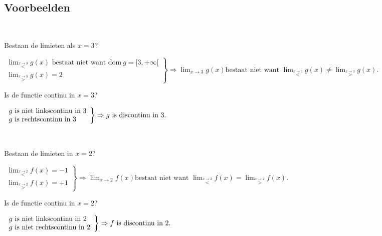 \subsection{Voorbeelden}
\begin{voorbeeld}
	\ \\


\begin{figure}[H]
	\centering
	
\end{figure}

	
Bestaan de limieten als $x=3$?

\begin{math}
\left. \begin{array}{l}
\lim_{\overset{x\rightarrow3}{<}}g(x) \text{ bestaat niet want dom} \ g=[3,+\infty[\\
 \lim_{\overset{x\rightarrow3}{>}}g(x)=2
\end{array}
\right\}
\Rightarrow \lim_{x\to3}g(x) \text{bestaat niet want } \lim_{\overset{x\rightarrow3}{<}}g(x) \neq \lim_{\overset{x\rightarrow3}{>}}g(x).
\end{math}

Is de functie continu in $x=3$?

\begin{math}
\centering
\left. \begin{array}{l}
g \text{ is niet linkscontinu in }3\\
g \text{ is rechtscontinu in }3
\end{array}
\right\}
\Rightarrow g \text{ is discontinu in }3.
\end{math}

\end{voorbeeld}
\begin{voorbeeld}
	\ \\


\begin{figure}[H]
	\centering
	
\end{figure}



Bestaan de limieten in $x=2$?

\begin{math}
\left. \begin{array}{l}
\lim_{\overset{x\rightarrow2}{<}}f(x)=-1 \\
 \lim_{\overset{x\rightarrow2}{>}}f(x)=+1
\end{array}
\right\}
\Rightarrow \lim_{x\to2}f(x) \text{bestaat niet want } \lim_{\overset{x\rightarrow2}{<}}f(x) = \lim_{\overset{x\rightarrow2}{>}}f(x).
\end{math}

Is de functie continu in $x=2$?

\begin{math}
\centering
\left. \begin{array}{l}
g \text{ is niet linkscontinu in }2\\
g \text{ is niet rechtscontinu in }2
\end{array}
\right\}
\Rightarrow f \text{ is discontinu in }2.
\end{math}


\end{voorbeeld}
